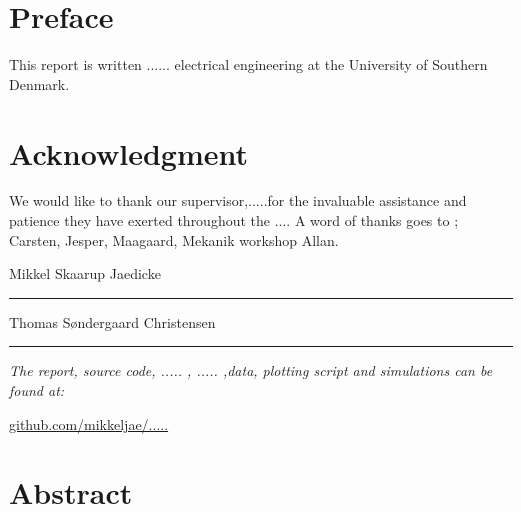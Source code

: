 
\section*{Preface}
This report is written ...... electrical engineering at the University of Southern Denmark.

\section*{Acknowledgment}

We would like to thank our supervisor,.....for the invaluable assistance and patience they have exerted throughout the ....
A word of thanks goes to ; Carsten, Jesper, Maagaard, Mekanik workshop Allan.


\vspace{1cm}
\begin{center}
	\begin{minipage}[t]{.49\textwidth}\large
		\begin{center}
		Mikkel Skaarup Jaedicke\\
		\vspace{1cm}
		\hrule
		\vspace{0.5cm}
		Thomas Søndergaard Christensen
		\vspace{1cm}
		\hrule
		\end{center} 
	\end{minipage}
\end{center}

\vspace{1.2cm}
  \begin{center}
    \textsl{The report, source code, ..... , ..... ,data, plotting script and simulations can be found at:}  
    \end{center}
    \vspace{-5pt}
    \begin{center}
	\renewcommand{\UrlFont}{\color{black}\normalsize\tt}
    \url{github.com/mikkeljae/.....}
   \end{center}
\newpage

\section*{Abstract}
\lipsum[5]